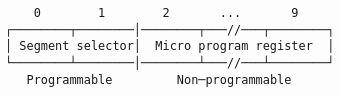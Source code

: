 \documentclass[varwidth,crop]{standalone}
\begin{document}
\begin{verbatim}
    0        1        2       ...       9
┌────────┬────────│────────┬───//───┬────────┐
│ Segment selector│  Micro program register  │
└────────┴────────│────────┴───//───┴────────┘
   Programmable         Non─programmable
\end{verbatim}
\end{document}
